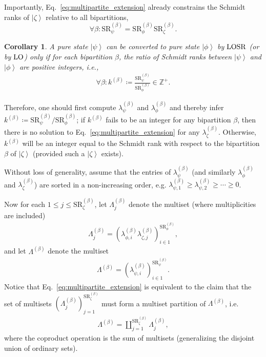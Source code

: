 \documentclass[12pt]{article}
\newcommand{\rob}{\color{black}}
\newcommand{\ket}[1]{\left| #1 \right>}
\newcommand{\LOSR}[0]{\ifmmode\textup{\upshape LOSR}\else{\textup{\upshape LOSR}}\fi}
\newcommand{\LO}[0]{\ifmmode\textup{\upshape LO}\else{\textup{\upshape LO}}\fi}
\theoremstyle{plain}
\newtheorem{cor}[theo]{Corollary}
\theoremstyle{definition}
\begin{document}
\begin{appendices}
Importantly, Eq.~\eqref{eq:multipartite_extension} already constrains the Schmidt ranks of $\ket{\zeta}$ relative to all bipartitions,
\[ \forall \beta: \mathrm{SR}_{\psi}^{(\beta)} = \mathrm{SR}_{\phi}^{(\beta)} \mathrm{SR}_{\zeta}^{(\beta)}. \]

\begin{cor} 
    \label{rankcoro}
    A pure state $\ket \psi$ can be converted to pure state $\ket \phi$ by $\LOSR$ (or by $\LO$) only if for each bipartition $\beta$, the ratio of Schmidt ranks between $\ket \psi$ and $\ket \phi$ are positive integers, i.e.,
    \begin{align}
        \forall \beta : k^{(\beta)} \coloneqq \frac{\mathrm{SR}_{\psi}^{(\beta)}}{\mathrm{SR}_{\phi}^{(\beta)}} \in \mathbb Z^+.
    \end{align}
\end{cor}

Therefore, one should first compute $\lambda_{\psi}^{(\beta)}$ and $\lambda_{\phi}^{(\beta)}$ and thereby infer
$k^{(\beta)} \coloneqq \mathrm{SR}_{\psi}^{(\beta)} / \mathrm{SR}_{\phi}^{(\beta)}$;
if $k^{(\beta)}$
fails to be an integer for any bipartition $\beta$, then there is no solution to Eq.~\eqref{eq:multipartite_extension} for any $\lambda_{\zeta}^{(\beta)}$.
\rob Otherwise, $k^{(\beta)}$ will be an integer equal to the Schmidt rank with respect to the bipartition $\beta$ of $\ket{\zeta}$ (provided such a $\ket{\zeta}$ exists).

Without loss of generality, assume that the entries of $\lambda_{\psi}^{(\beta)}$ (and similarly $\lambda_{\phi}^{(\beta)}$ and $\lambda_{\zeta}^{(\beta)}$) are sorted in a non-increasing order, e.g. $\lambda_{\psi, 1}^{(\beta)} \geq \lambda_{\psi, 2}^{(\beta)} \geq \cdots \geq 0$.

Now for each $1 \leq j \leq \mathrm{SR}_{\zeta}^{(\beta)}$, let $\Lambda_{j}^{(\beta)}$ denote the multiset (where multiplicities are included)
\begin{align}
    \Lambda_{j}^{(\beta)} = (\lambda_{\phi,i}^{(\beta)}\lambda_{\zeta,j}^{(\beta)})_{i \in 1}^{\mathrm{SR}_{\phi}^{(\beta)}},
\end{align}
and let $\Lambda^{(\beta)}$ denote the multiset
\begin{align}
    \Lambda^{(\beta)} = (\lambda_{\psi,i}^{(\beta)})_{i \in 1}^{\mathrm{SR}_{\psi}^{(\beta)}}.
\end{align}
Notice that Eq.~\eqref{eq:multipartite_extension} is equivalent to the claim that the set of multisets $(\Lambda_{j}^{(\beta)})_{j = 1}^{\mathrm{SR}_{\zeta}^{(\beta)}}$ must form a multiset partition of $\Lambda^{(\beta)}$, i.e.
\begin{align}
    \label{eq:multiset_partition}
    \Lambda^{(\beta)} = \coprod_{j=1}^{\mathrm{SR}_{\zeta}^{(\beta)}}\Lambda_{j}^{(\beta)},
\end{align}
where the coproduct operation is the sum of multisets (generalizing the disjoint union of ordinary sets).


\end{appendices}
\end{document}
